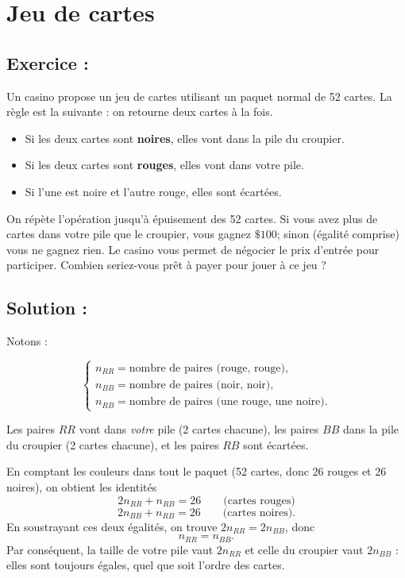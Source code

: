 \section{Jeu de cartes}

\subsection*{Exercice :}

\begin{exerciseBox}
Un casino propose un jeu de cartes utilisant un paquet normal de 52 cartes.
La règle est la suivante : on retourne deux cartes à la fois.
\begin{itemize}
    \item Si les deux cartes sont \textbf{noires}, elles vont dans la pile du croupier.
    \item Si les deux cartes sont \textbf{rouges}, elles vont dans votre pile.
    \item Si l’une est noire et l’autre rouge, elles sont écartées.
\end{itemize}
On répète l’opération jusqu’à épuisement des 52 cartes.  
Si vous avez plus de cartes dans votre pile que le croupier, vous gagnez \(\$100\); sinon (égalité comprise) vous ne gagnez rien.  
Le casino vous permet de négocier le prix d’entrée pour participer.  
Combien seriez-vous prêt à payer pour jouer à ce jeu ?
    
\end{exerciseBox}

\subsection*{Solution :}

Notons :

\[
\begin{cases}
n_{RR}=\text{nombre de paires (rouge, rouge)},\\
n_{BB}=\text{nombre de paires (noir, noir)},\\
n_{RB}=\text{nombre de paires (une rouge, une noire)}.    
\end{cases}
\]

Les paires \(RR\) vont dans \emph{votre} pile (2 cartes chacune), les paires \(BB\) dans la pile du croupier (2 cartes chacune), et les paires \(RB\) sont écartées.

En comptant les couleurs dans tout le paquet (52 cartes, donc 26 rouges et 26 noires), on obtient les identités
\[
2n_{RR}+n_{RB}=26 \qquad\text{(cartes rouges)}
\]
\[
2n_{BB}+n_{RB}=26 \qquad\text{(cartes noires)}.
\]
En soustrayant ces deux égalités, on trouve \(2n_{RR}=2n_{BB}\), donc
\[
n_{RR}=n_{BB}.
\]
Par conséquent, la taille de votre pile vaut \(2n_{RR}\) et celle du croupier vaut \(2n_{BB}\) : elles sont toujours égales, quel que soit l’ordre des cartes.

